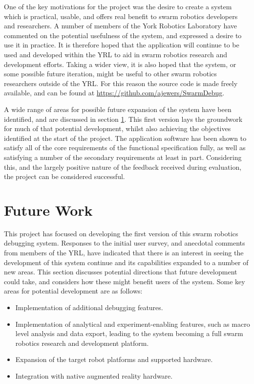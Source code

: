 One of the key motivations for the project was the desire to create a system which is practical, usable, and offers real benefit to swarm robotics developers and researchers. A number of members of the York Robotics Laboratory have commented on the potential usefulness of the system, and expressed a desire to use it in practice. It is therefore hoped that the application will continue to be used and developed within the YRL to aid in swarm robotics research and development efforts. Taking a wider view, it is also hoped that the system, or some possible future iteration, might be useful to other swarm robotics researchers outside of the YRL. For this reason the source code is made freely available, and can be found at \url{https://github.com/ajewers/SwarmDebug}.

A wide range of areas for possible future expansion of the system have been identified, and are discussed in section \ref{FutureWork}. This first version lays the groundwork for much of that potential development, whilst also achieving the objectives identified at the start of the project. The application software has been shown to satisfy all of the core requirements of the functional specification fully, as well as satisfying a number of the secondary requirements at least in part. Considering this, and the largely positive nature of the feedback received during evaluation, the project can be considered successful.


\section{Future Work} \label{FutureWork}

This project has focused on developing the first version of this swarm robotics debugging system. Responses to the initial user survey, and anecdotal comments from members of the YRL, have indicated that there is an interest in seeing the development of this system continue and its capabilities expanded to a number of new areas. This section discusses potential directions that future development could take, and considers how these might benefit users of the system. Some key areas for potential development are as follows:

\begin{itemize}
 \item Implementation of additional debugging features.
 \item Implementation of analytical and experiment-enabling features, such as macro level analysis and data export, leading to the system becoming a full swarm robotics research and development platform.
 \item Expansion of the target robot platforms and supported hardware.
 \item Integration with native augmented reality hardware.
\end{itemize}

